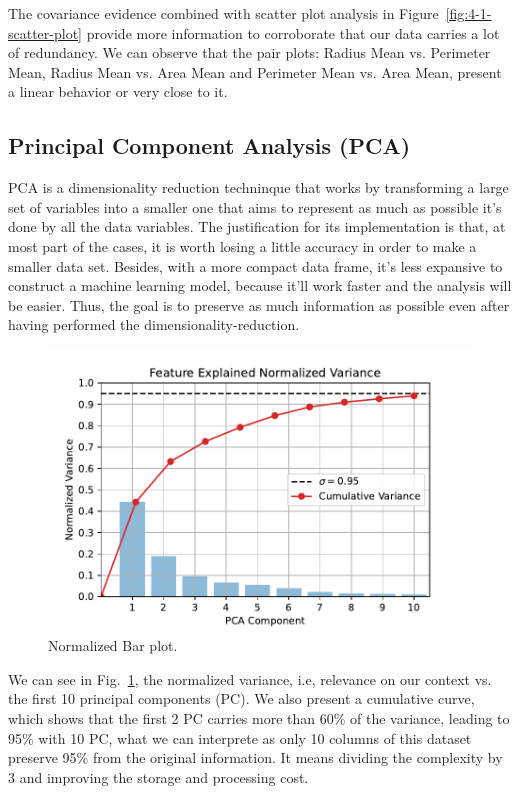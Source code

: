 \documentclass[conference]{IEEEtran}
\begin{document}
The covariance evidence combined with scatter plot analysis in Figure~\ref{fig:4-1-scatter-plot} provide more information to corroborate that our data carries a lot of redundancy. We can observe that the pair plots: Radius Mean vs. Perimeter Mean, Radius Mean vs. Area Mean and Perimeter Mean vs. Area Mean, present a linear behavior or very close to it.


\subsection{Principal Component Analysis (PCA)}

PCA is a dimensionality reduction techninque that works by transforming a large set of variables into a smaller one that aims to represent as much as possible it's done by all the data variables. The justification for its implementation is that, at most part of the cases, it is worth losing a little accuracy in order to make a smaller data set. Besides, with a more compact data frame, it's less expansive to construct a machine learning model, because it'll work faster and the analysis will be easier. Thus, the goal is to preserve as much information as possible even after having performed the dimensionality-reduction.

\begin{figure}[htbp]
    \centerline{\includegraphics[width=0.5 \textwidth]{../../code/hw1/figures/5-1-PCA-10PC-variance.pdf}}
    \caption{Normalized Bar plot.}
    \label{fig:5-1-PCA-10PC-variance}
\end{figure}

We can see in Fig.~\ref{fig:5-1-PCA-10PC-variance}, the normalized variance, i.e, relevance on our context vs. the first 10 principal components (PC). We also present a cumulative curve, which shows that the first 2 PC carries more than 60\% of the variance, leading to 95\% with 10 PC, what we can interprete as only 10 columns of this dataset preserve 95\% from the original information. It means dividing the complexity by 3 and improving the storage and processing cost.
\end{document}
